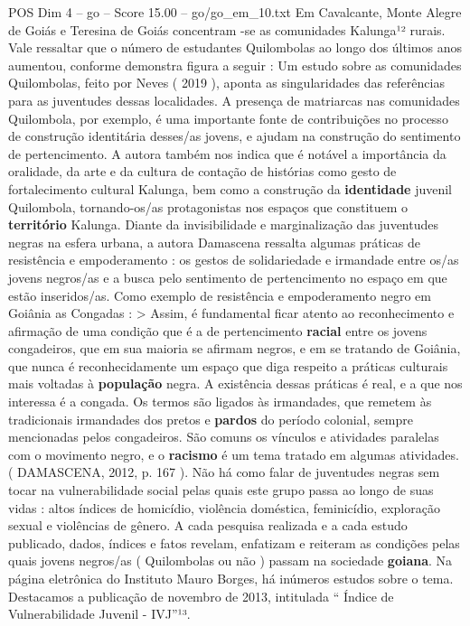 \begin{textsample}{POS Dim 4 – go – Score 15.00 – go/go\_em\_10.txt}
Em Cavalcante, Monte Alegre de Goiás e Teresina de Goiás concentram -se as comunidades Kalunga¹² rurais.
Vale ressaltar que o número de estudantes Quilombolas ao longo dos últimos anos aumentou, conforme demonstra figura a seguir : Um estudo sobre as comunidades Quilombolas, feito por Neves ( 2019 ), aponta as singularidades das referências para as juventudes dessas localidades.
A presença de matriarcas nas comunidades Quilombola, por exemplo, é uma importante fonte de contribuições no processo de construção identitária desses/as jovens, e ajudam na construção do sentimento de pertencimento.
A autora também nos indica que é notável a importância da oralidade, da arte e da cultura de contação de histórias como gesto de fortalecimento cultural Kalunga, bem como a construção da \textbf{identidade} juvenil Quilombola, tornando-os/as protagonistas nos espaços que constituem o \textbf{território} Kalunga.
Diante da invisibilidade e marginalização das juventudes negras na esfera urbana, a autora Damascena ressalta algumas práticas de resistência e empoderamento : os gestos de solidariedade e irmandade entre os/as jovens negros/as e a busca pelo sentimento de pertencimento no espaço em que estão inseridos/as.
Como exemplo de resistência e empoderamento negro em Goiânia as Congadas : > Assim, é fundamental ficar atento ao reconhecimento e afirmação de uma condição que é a de pertencimento \textbf{racial} entre os jovens congadeiros, que em sua maioria se afirmam negros, e em se tratando de Goiânia, que nunca é reconhecidamente um espaço que diga respeito a práticas culturais mais voltadas à \textbf{população} negra.
A existência dessas práticas é real, e a que nos interessa é a congada.
Os termos são ligados às irmandades, que remetem às tradicionais irmandades dos pretos e \textbf{pardos} do período colonial, sempre mencionadas pelos congadeiros.
São comuns os vínculos e atividades paralelas com o movimento negro, e o \textbf{racismo} é um tema tratado em algumas atividades. ( DAMASCENA, 2012, p. 167 ).
Não há como falar de juventudes negras sem tocar na vulnerabilidade social pelas quais este grupo passa ao longo de suas vidas : altos índices de homicídio, violência doméstica, feminicídio, exploração sexual e violências de gênero.
A cada pesquisa realizada e a cada estudo publicado, dados, índices e fatos revelam, enfatizam e reiteram as condições pelas quais jovens negros/as ( Quilombolas ou não ) passam na sociedade \textbf{goiana}.
Na página eletrônica do Instituto Mauro Borges, há inúmeros estudos sobre o tema.
Destacamos a publicação de novembro de 2013, intitulada “ Índice de Vulnerabilidade Juvenil - IVJ”¹³.

\end{textsample}

